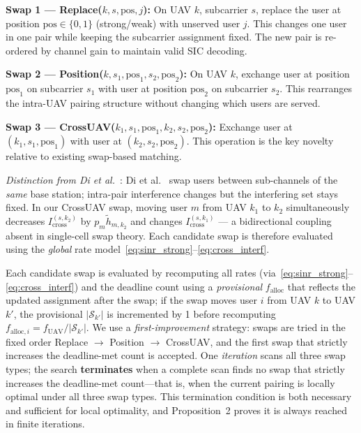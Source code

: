 \documentclass[journal]{IEEEtran}
\begin{document}
\textbf{Swap 1 --- Replace($k, s, \text{pos}, j$):}
On UAV $k$, subcarrier $s$, replace the user at position $\text{pos} \in \{0,1\}$ (strong/weak) with unserved user $j$.
This changes one user in one pair while keeping the subcarrier assignment fixed.
The new pair is re-ordered by channel gain to maintain valid SIC decoding.

\textbf{Swap 2 --- Position($k, s_1, \text{pos}_1, s_2, \text{pos}_2$):}
On UAV $k$, exchange user at position $\text{pos}_1$ on subcarrier $s_1$ with user at position $\text{pos}_2$ on subcarrier $s_2$.
This rearranges the intra-UAV pairing structure without changing which users are served.

\textbf{Swap 3 --- CrossUAV($k_1, s_1, \text{pos}_1, k_2, s_2, \text{pos}_2$):}
Exchange user at $(k_1, s_1, \text{pos}_1)$ with user at $(k_2, s_2, \text{pos}_2)$.
This operation is the key novelty relative to existing swap-based matching.

\emph{Distinction from Di et al.~\cite{di2017sub}}:
Di et al.~\cite{di2017sub} swap users between sub-channels of the \emph{same} base station; intra-pair interference changes but the interfering set stays fixed.
In our CrossUAV swap, moving user $m$ from UAV $k_1$ to $k_2$ simultaneously decreases $I_{\text{cross}}^{(s,k_2)}$ by $p_m \tilde{h}_{m,k_2}$ and changes $I_{\text{cross}}^{(s,k_1)}$ --- a bidirectional coupling absent in single-cell swap theory.
Each candidate swap is therefore evaluated using the \emph{global} rate model~\eqref{eq:sinr_strong}--\eqref{eq:cross_interf}.

Each candidate swap is evaluated by recomputing all rates (via~\eqref{eq:sinr_strong}--\eqref{eq:cross_interf}) and the deadline count using a \emph{provisional} $f_{\text{alloc}}$ that reflects the updated assignment after the swap; if the swap moves user $i$ from UAV $k$ to UAV $k'$, the provisional $|\mathcal{S}_{k'}|$ is incremented by 1 before recomputing $f_{\text{alloc},i} = f_{\text{UAV}}/|\mathcal{S}_{k'}|$.
We use a \emph{first-improvement} strategy: swaps are tried in the fixed order Replace $\to$ Position $\to$ CrossUAV, and the first swap that strictly increases the deadline-met count is accepted.
One \emph{iteration} scans all three swap types; the search \textbf{terminates} when a complete scan finds no swap that strictly increases the deadline-met count---that is, when the current pairing is locally optimal under all three swap types.
This termination condition is both necessary and sufficient for local optimality, and Proposition~2 proves it is always reached in finite iterations.
\end{document}

